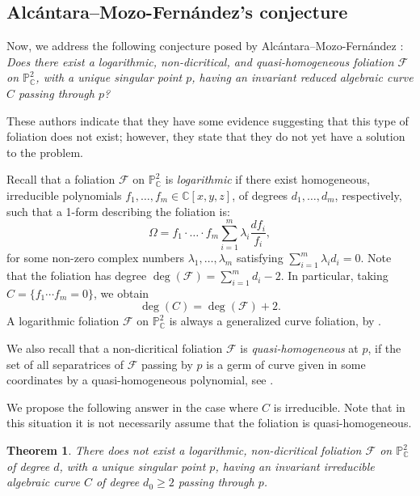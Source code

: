 \documentclass[11pt]{amsart}
\newcommand{\C}{\mathbb{C}}
\newcommand{\F}{\mathcal{F}}
\newtheorem{theorem}{Theorem}[section]
\begin{document}
\subsection{Alc\'antara--Mozo-Fern\'andez's conjecture}
Now, we address the following conjecture posed by Alc\'antara--Mozo-Fern\'andez \cite[p. 16]{Alcantara}:
{\it Does there exist a logarithmic, non-dicritical, and quasi-homogeneous foliation $\F$ on $\mathbb{P}^2_\C$, with a unique singular point $p$, having an invariant reduced algebraic curve $C$ passing through $p$? }

\par These authors indicate that they have some evidence suggesting that this type of foliation does not exist; however, they state that they do not yet have a solution to the problem. 
\par Recall that a foliation $\F$ on $\mathbb{P}^{2}_\C$ is \textit{logarithmic} if there exist homogeneous, irreducible polynomials $f_1,\ldots,f_m\in\C[x,y,z]$, of degrees $d_1,\ldots,d_m$, respectively, such that a  1-form describing the foliation is:
\[\Omega=f_1\cdot\ldots\cdot f_m\sum_{i=1}^{m}\lambda_i\frac{df_i}{f_i},\]
\noindent for some non-zero complex numbers $\lambda_1,\ldots,\lambda_m$ satisfying $\sum_{i=1}^{m}\lambda_i d_i=0$. Note that the foliation has degree $\deg(\F)=\sum_{i=1}^{m}d_i-2$. In particular, taking $C=\{f_1\cdots f_m=0\}$, we obtain 
\begin{equation}\label{eq_degree}
    \deg(C)=\deg(\F)+2.
\end{equation} 
A logarithmic foliation $\F$ on $\mathbb{P}^2_\C$ is always a generalized curve foliation, by \cite[Section 6]{FP-M}.
\par We also recall that a non-dicritical foliation $\F$ is \textit{quasi-homogeneous} at $p$, if the set of all separatrices of $\F$ passing by $p$ is a germ of curve given in some coordinates by a quasi-homogeneous polynomial, see \cite[p. 1657]{Genzmer2008}.
\par We propose the following answer in the case where $C$ is irreducible. Note that in this situation it is not necessarily assume that the foliation is quasi-homogeneous. 
\begin{theorem}
There does not exist a logarithmic, non-dicritical foliation $\F$ on $\mathbb{P}^2_\C$ of degree $d$, with a unique singular point $p$, having an invariant irreducible algebraic curve $C$ of degree $d_0\geq 2$ passing through $p$. 
\end{theorem}
\end{document}
